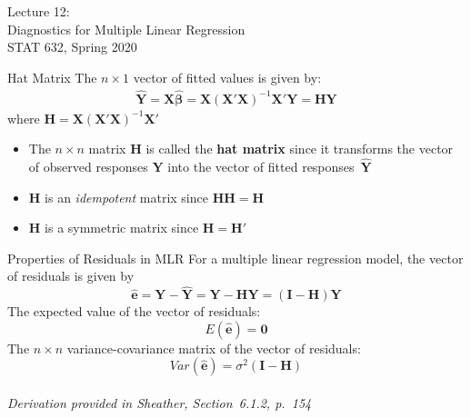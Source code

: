 \documentclass[10pt]{beamer}\usepackage[]{graphicx}\usepackage[]{color}
\begin{document}
\begin{frame}
\large
Lecture 12:\\ 
Diagnostics for Multiple Linear Regression\\
STAT 632, Spring 2020\\
\end{frame}


\begin{frame}{Hat Matrix}
The $n \times 1$ vector of fitted values is given by:
\begin{align*}
\bm{\hat{Y}} = \bm{X \hat{\beta}} = \bm{X(X'X)}^{-1}\bm{X'Y} = \bm{HY}
\end{align*}
where $\bm{H} = \bm{X(X'X)}^{-1}\bm{X}'$\\
\vspace{10pt}
\begin{itemize}
\item The $n \times n$ matrix $\bm{H}$ is called the \textbf{hat matrix} since it transforms the vector of observed responses $\bm{Y}$ into the vector of fitted responses~$\bm{\hat{Y}}$
\vspace{5pt}
\item $\bm{H}$ is an \emph{idempotent} matrix since $\bm{HH} = \bm{H}$
\vspace{5pt}
\item $\bm{H}$ is a symmetric matrix since $\bm{H} = \bm{H'}$
\end{itemize}
\end{frame}


\begin{frame}{Properties of Residuals in MLR}
For a multiple linear regression model, the vector of residuals is given by
$$\bm{\hat{e}} = \bm{Y} - \bm{\hat{Y}} = \bm{Y} - \bm{HY} = (\bm{I}-\bm{H})\bm{Y}$$
The expected value of the vector of residuals:
$$ E(\hat{\bm{e}}) = \bm{0} $$
The $n \times n$ variance-covariance matrix of the vector of residuals:
$$ Var(\hat{\bm{e}}) = \sigma^2 (\bm{I}-\bm{H}) $$\\
\vspace{15pt}
\emph{Derivation provided in Sheather, Section~6.1.2, p.~154}
\end{frame}
\end{document}
